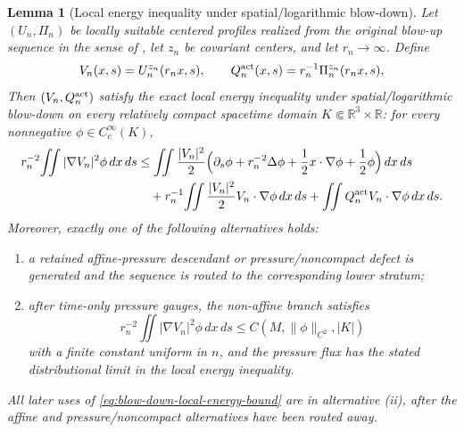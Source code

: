 \documentclass[11pt]{amsart}
\numberwithin{equation}{section}
\theoremstyle{plain}
\newtheorem{lemma}[lemma]{Lemma}
\theoremstyle{definition}
\theoremstyle{remark}
\begin{document}
\begin{lemma}[Local energy inequality under spatial/logarithmic blow-down]
\label{lem:local-energy-blow-down}
Let \((U_n,\Pi_n)\) be locally suitable centered profiles realized from the
original blow-up sequence in the sense of
, let \(z_n\) be covariant
centers, and let \(r_n\to\infty\).  Define
\[
   V_n(x,s)=U_n^{z_n}(r_nx,s),
   \qquad
   Q_n^{\rm act}(x,s)=r_n^{-1}\Pi_n^{z_n}(r_nx,s),
\]
Then \((V_n,Q_n^{\rm act})\) satisfy the exact local energy inequality under
spatial/logarithmic blow-down on every relatively compact spacetime domain
\(K\Subset\mathbb R^3\times\mathbb R\): for every nonnegative
\(\phi\in C_c^\infty(K)\),
\begin{equation}\label{eq:blow-down-local-energy}
\begin{aligned}
   r_n^{-2}\!\iint |\nabla V_n|^2\phi\,dx\,ds
   &\le
   \iint \frac{|V_n|^2}{2}
   \Bigl(
      \partial_s\phi
      +r_n^{-2}\Delta\phi
      +\frac12 x\cdot\nabla\phi
      +\frac12\phi
   \Bigr)\,dx\,ds\\
   &\quad
   +r_n^{-1}\!\iint
   \frac{|V_n|^2}{2}V_n\cdot\nabla\phi\,dx\,ds
   +\iint Q_n^{\rm act} V_n\cdot\nabla\phi\,dx\,ds .
\end{aligned}
\end{equation}
Moreover, exactly one of the following alternatives holds:
\begin{enumerate}[label=\textup{(\roman*)},leftmargin=2.2em]
\item a retained affine-pressure descendant or pressure/noncompact defect is
generated and the sequence is routed to the corresponding lower stratum;
\item after time-only pressure gauges, the non-affine branch satisfies
\begin{equation}\label{eq:blow-down-local-energy-bound}
   r_n^{-2}\!\iint |\nabla V_n|^2\phi\,dx\,ds
   \le
   C\!\left(M,\|\phi\|_{C^2},|K|\right)
\end{equation}
with a finite constant uniform in \(n\), and the pressure flux has the stated
distributional limit in the local energy inequality.
\end{enumerate}
All later uses of \eqref{eq:blow-down-local-energy-bound} are in alternative
\textup{(ii)}, after the affine and pressure/noncompact alternatives have been
routed away.
\end{lemma}
\end{document}
